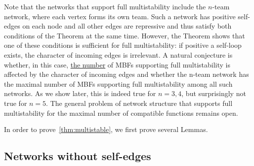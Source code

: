 \documentclass[12pt]{amsart}
\theoremstyle{definition}
\begin{document}
Note that the networks that support full multistability include the $n$-team network, where each vertex forms its own team. Such a network has positive self-edges on each node and all other edges are repressive and thus satisfy both conditions of the Theorem at the same time. However, the Theorem shows that one of these conditions is sufficient for full multistability: if positive a self-loop exists, the character of incoming edges is irrelevant. A natural conjecture is whether, in this case, \underline{the number} of MBFs supporting full multistability is affected by the character of incoming edges and whether the n-team network has the maximal number of MBFs supporting full multistability among all such networks. As we show later, this is indeed true for $n=3,4$, but surprisingly not true for $n=5$. The general problem of network structure that supports full multistability for the maximal number of compatible functions remains open.

In order to prove~\ref{thm:multistable}, we first prove several Lemmas.

\subsection{Networks without self-edges}
\end{document}
